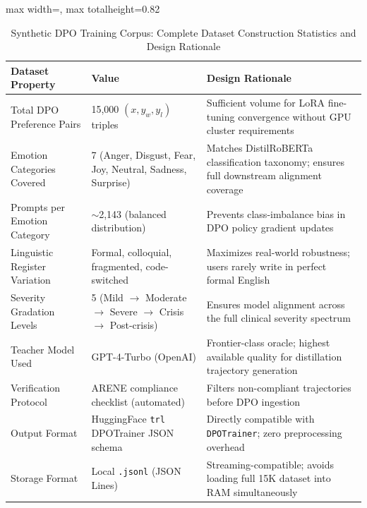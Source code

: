 \documentclass[12pt,twoside]{article}
\begin{document}
\begin{table}[htbp]
\centering
\Large
\renewcommand{\arraystretch}{2.4}
\setlength{\tabcolsep}{12pt}
\begin{adjustbox}{max width=\textwidth, max totalheight=0.82\textheight}
\begin{tabular}{|p{5.5cm}|p{4.5cm}|p{6.5cm}|}
\hline
\rowcolor{gray!20}
\textbf{Dataset Property} & \textbf{Value} & \textbf{Design Rationale} \\
\hline
Total DPO Preference Pairs & 15,000 $(x, y_w, y_l)$ triples & Sufficient volume for LoRA fine-tuning convergence without GPU cluster requirements \\
\hline
Emotion Categories Covered & 7 (Anger, Disgust, Fear, Joy, Neutral, Sadness, Surprise) & Matches DistilRoBERTa classification taxonomy; ensures full downstream alignment coverage \\
\hline
Prompts per Emotion Category & $\sim$2,143 (balanced distribution) & Prevents class-imbalance bias in DPO policy gradient updates \\
\hline
Linguistic Register Variation & Formal, colloquial, fragmented, code-switched & Maximizes real-world robustness; users rarely write in perfect formal English \\
\hline
Severity Gradation Levels & 5 (Mild $\rightarrow$ Moderate $\rightarrow$ Severe $\rightarrow$ Crisis $\rightarrow$ Post-crisis) & Ensures model alignment across the full clinical severity spectrum \\
\hline
Teacher Model Used & GPT-4-Turbo (OpenAI) & Frontier-class oracle; highest available quality for distillation trajectory generation \\
\hline
Verification Protocol & ARENE compliance checklist (automated) & Filters non-compliant trajectories before DPO ingestion \\
\hline
Output Format & HuggingFace \texttt{trl} DPOTrainer JSON schema & Directly compatible with \texttt{DPOTrainer}; zero preprocessing overhead \\
\hline
Storage Format & Local \texttt{.jsonl} (JSON Lines) & Streaming-compatible; avoids loading full 15K dataset into RAM simultaneously \\
\hline
\end{tabular}
\end{adjustbox}
\caption{Synthetic DPO Training Corpus: Complete Dataset Construction Statistics and Design Rationale}
\label{tab:corpus_stats}
\end{table}
\end{document}
